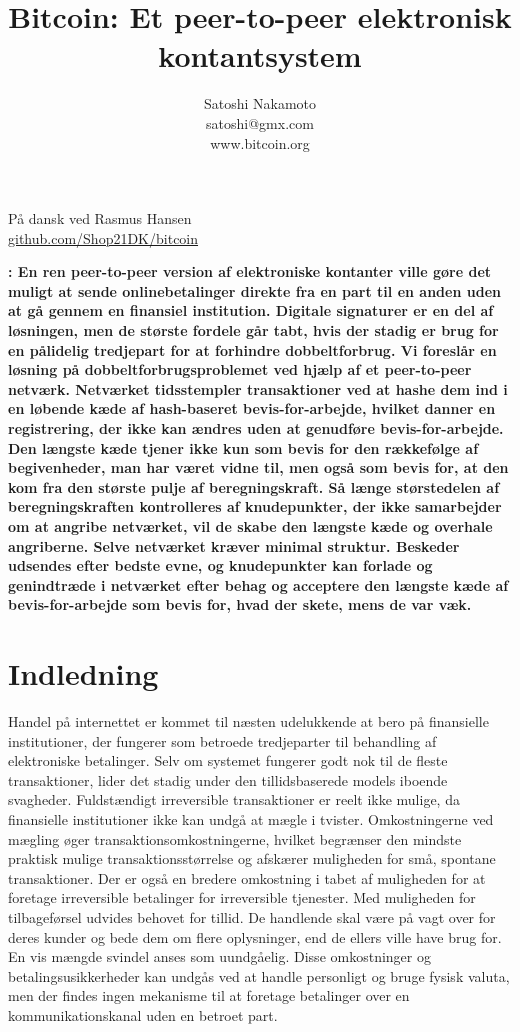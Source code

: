 \documentclass{article}
\title{Bitcoin: Et peer-to-peer elektronisk kontantsystem}
\author{Satoshi Nakamoto \\ satoshi@gmx.com \\ www.bitcoin.org}
\date{}%
\renewenvironment{abstract}{\noindent\bfseries\abstractname:\normalfont}{}%
\begin{document}
\maketitle

\begin{center}
    På dansk ved Rasmus Hansen\\
    \href{https://github.com/Shop21DK/bitcoin}{github.com/Shop21DK/bitcoin}
\end{center}

\begin{abstract}
    En ren peer-to-peer version af elektroniske kontanter ville gøre det muligt at sende onlinebetalinger direkte fra en part til en anden uden at gå gennem en finansiel
    institution. Digitale signaturer er en del af løsningen, men de største fordele går tabt, hvis der stadig er brug for en pålidelig tredjepart for at forhindre dobbeltforbrug.
    Vi foreslår en løsning på dobbeltforbrugsproblemet ved hjælp af et peer-to-peer netværk. Netværket tidsstempler transaktioner ved at hashe dem ind i en løbende kæde af
    hash-baseret bevis-for-arbejde, hvilket danner en registrering, der ikke kan ændres uden at genudføre bevis-for-arbejde. Den længste kæde tjener ikke kun som bevis for den
    rækkefølge af begivenheder, man har været vidne til, men også som bevis for, at den kom fra den største pulje af beregningskraft. Så længe størstedelen af beregningskraften
    kontrolleres af knudepunkter, der ikke samarbejder om at angribe netværket, vil de skabe den længste kæde og overhale angriberne. Selve netværket kræver minimal struktur.
    Beskeder udsendes efter bedste evne, og knudepunkter kan forlade og genindtræde i netværket efter behag og acceptere den længste kæde af bevis-for-arbejde som bevis for,
    hvad der skete, mens de var væk.
\end{abstract}

\section{Indledning}\label{sec:introduction}
Handel på internettet er kommet til næsten udelukkende at bero på finansielle institutioner, der fungerer som betroede tredjeparter til behandling af elektroniske betalinger.
Selv om systemet fungerer godt nok til de fleste transaktioner, lider det stadig under den tillidsbaserede models iboende svagheder. Fuldstændigt irreversible transaktioner er
reelt ikke mulige, da finansielle institutioner ikke kan undgå at mægle i tvister. Omkostningerne ved mægling øger transaktionsomkostningerne, hvilket begrænser den mindste
praktisk mulige transaktionsstørrelse og afskærer muligheden for små, spontane transaktioner. Der er også en bredere omkostning i tabet af muligheden for at foretage
irreversible betalinger for irreversible tjenester. Med muligheden for tilbageførsel udvides behovet for tillid. De handlende skal være på vagt over for deres kunder og bede dem
om flere oplysninger, end de ellers ville have brug for. En vis mængde svindel anses som uundgåelig. Disse omkostninger og betalingsusikkerheder kan undgås ved at handle
personligt og bruge fysisk valuta, men der findes ingen mekanisme til at foretage betalinger over en kommunikationskanal uden en betroet part.
\end{document}
